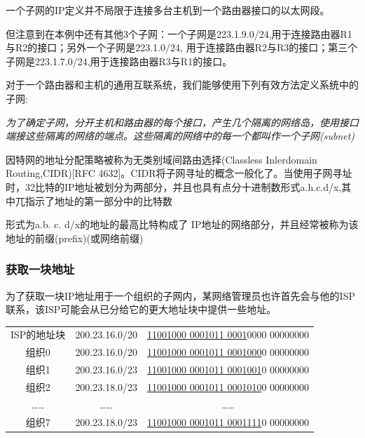     一个子网的IP定义并不局限于连接多台主机到一个路由器接口的以太网段。

    但注意到在本例中还有其他3个子网：一个子网是223.1.9.0/24,用于连接路由器R1与R2的接口；另外一个子网是223.1.0/24, 用于连接路由器R2与R3的接口；第三个子网是223.1.7.0/24,用于连接路由器R3与R1的接口。

    对于一个路由器和主机的通用互联系统，我们能够使用下列有效方法定义系统中的子网:

    \emph{为了确定子网，分开主机和路由器的每个接口，产生几个隔离的网络岛，使用接口端接这些隔离的网络的端点。这些隔离的网络中的每一个都叫作一个子网(subnet)}

    因特网的地址分配策略被称为无类别域间路由选择(Classless Inlerdomain Routing,CIDR)[RFC 4632]。CIDR将子网寻址的概念一般化了。当使用子网寻址时，32比特的IP地址被划分为两部分，并且也具有点分十进制数形式a.h.c.d/x,其中兀指示了地址的第一部分中的比特数

    形式为a.b. c. d/x的地址的最高比特构成了 IP地址的网络部分，并且经常被称为该地址的前缀(prefix)(或网络前缀)

\subsubsection{获取一块地址}

    为了获取一块IP地址用于一个组织的子网内，某网络管理员也许首先会与他的ISP联系，该ISP可能会从已分给它的更大地址块中提供一些地址。

\begin{table}[!htbp]
    \begin{center}
        \begin{tabular}{c c c}
            ISP的地址块 & 200.23.16.0/20 & \underline{11001000 0001011 0001}0000 00000000 \\
            组织0 & 200.23.16.0/20 & \underline{11001000 0001011 0001000}0 00000000 \\
            组织1 & 200.23.16.0/23 & \underline{11001000 0001011 0001001}0 00000000 \\
            组织2 & 200.23.18.0/23 & \underline{11001000 0001011 0001010}0 00000000 \\
            \dots\dots & \dots\dots & \dots\dots \\
            组织7 & 200.23.18.0/23 & \underline{11001000 0001011 0001111}0 00000000 \\
        \end{tabular}
    \end{center}
\end{table}

